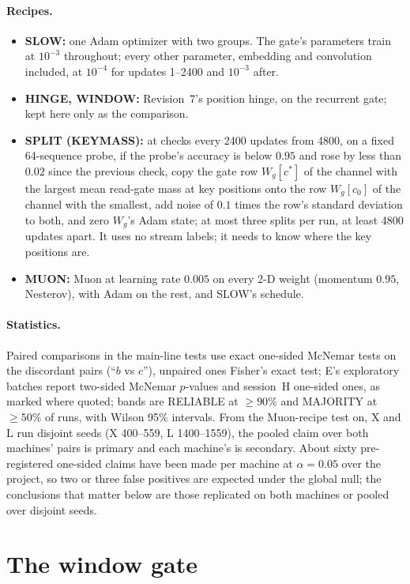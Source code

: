 \documentclass[11pt]{article}
\begin{document}
\paragraph{Recipes.}
\begin{itemize}
\item \textbf{SLOW:} one Adam optimizer with two groups. The gate's parameters train at $10^{-3}$ throughout; every other parameter, embedding and convolution included, at $10^{-4}$ for updates 1--2400 and $10^{-3}$ after.
\item \textbf{HINGE, WINDOW:} Revision~7's position hinge, on the recurrent gate; kept here only as the comparison.
\item \textbf{SPLIT (KEYMASS):} at checks every 2400 updates from 4800, on a fixed 64-sequence probe, if the probe's accuracy is below $0.95$ and rose by less than $0.02$ since the previous check, copy the gate row $W_g[c^*]$ of the channel with the largest mean read-gate mass at key positions onto the row $W_g[c_0]$ of the channel with the smallest, add noise of $0.1$ times the row's standard deviation to both, and zero $W_g$'s Adam state; at most three splits per run, at least 4800 updates apart. It uses no stream labels; it needs to know where the key positions are.
\item \textbf{MUON:} Muon at learning rate $0.005$ on every 2-D weight (momentum $0.95$, Nesterov), with Adam on the rest, and SLOW's schedule.
\end{itemize}

\paragraph{Statistics.} Paired comparisons in the main-line tests use exact one-sided McNemar tests on the discordant pairs (``$b$ vs $c$''), unpaired ones Fisher's exact test; E's exploratory batches report two-sided McNemar $p$-values and session~H one-sided ones, as marked where quoted; bands are RELIABLE at $\geq 90\%$ and MAJORITY at $\geq 50\%$ of runs, with Wilson 95\% intervals. From the Muon-recipe test on, X and L run disjoint seeds (X 400--559, L 1400--1559), the pooled claim over both machines' pairs is primary and each machine's is secondary. About sixty pre-registered one-sided claims have been made per machine at $\alpha = 0.05$ over the project, so two or three false positives are expected under the global null; the conclusions that matter below are those replicated on both machines or pooled over disjoint seeds.

\section{The window gate}
\label{sec:window}
\end{document}
